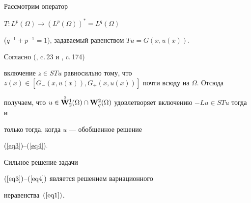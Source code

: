 \begin{note}


Рассмотрим оператор


$T:L^p(\Omega)\to(L^p(\Omega))^*= L^q(\Omega)$


($q^{-1}+p^{-1}=1$), задаваемый равенством $Tu=G(x,u(x))$.


Согласно (\cite{Pav7}, c.\,23 и \cite{Kras}, c.\,174)


включение $z\in STu$ равносильно тому, что $z(x)\in


[G_-(x,u(x)),G_+(x,u(x))]$ почти всюду на $\Omega$. Отсюда


получаем, что  $u\in \overset{\circ}{\bold W}{}_2^1(\Omega)\cap


{\bold{W}}_q^2(\Omega)$ удовлетворяет включению $-Lu\in STu$ тогда и


только тогда, когда $u$ --- обобщенное решение


(\ref{eq3})--(\ref{eq4}).


\end{note}





\begin{lem}


Сильное решение задачи


$(\ref{eq3})$--$(\ref{eq4})$ является решением вариационного


неравенства~$(\ref{eq1})$.


\end{lem}








